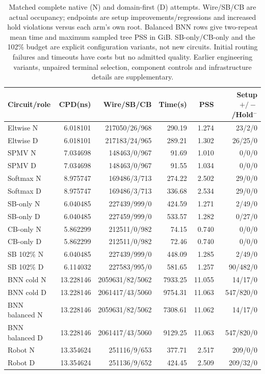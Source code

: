 \documentclass[conference,10pt]{IEEEtran}
\begin{document}
\begin{table}[t]
\centering\footnotesize\setlength{\tabcolsep}{3pt}
\caption{Matched complete native (N) and domain-first (D) attempts. Wire/SB/CB are actual occupancy; endpoints are setup improvements/regressions and increased hold violations versus each arm's own root. Balanced BNN rows give two-repeat mean time and maximum sampled tree PSS in GiB. SB-only/CB-only and the 102\% budget are explicit configuration variants, not new circuits. Initial routing failures and timeouts have costs but no admitted quality. Earlier engineering variants, unpaired terminal selection, component controls and infrastructure details are supplementary.}
\label{tab:completecost}
\begin{tabular}{lrrrrr}\hline
Circuit/role & CPD(ns) & Wire/SB/CB & Time(s) & PSS & Setup $+/-$/Hold$^-$\\\hline
Eltwise N&6.018101&217050/26/968&290.19&1.274&23/2/0\\
Eltwise D&6.018101&217183/24/965&289.21&1.302&26/25/0\\
SPMV N&7.034698&148463/0/967&91.69&1.010&0/0/0\\
SPMV D&7.034698&148463/0/967&91.55&1.034&0/0/0\\
Softmax N&8.975747&169486/3/713&274.22&2.502&29/0/0\\
Softmax D&8.975747&169486/3/713&336.68&2.534&29/0/0\\
SB-only N&6.040485&227439/999/0&424.59&1.271&2/49/0\\
SB-only D&6.040485&227459/999/0&533.57&1.282&0/27/0\\
CB-only N&5.862299&212511/0/982&74.15&0.740&0/0/0\\
CB-only D&5.862299&212511/0/982&72.46&0.740&0/0/0\\
SB 102\% N&6.040485&227439/999/0&448.09&1.285&2/49/0\\
SB 102\% D&6.114032&227583/995/0&581.65&1.257&90/482/0\\
BNN cold N&13.228146&2059631/82/5062&7933.25&11.055&14/17/0\\
BNN cold D&13.228146&2061417/43/5060&9754.31&11.063&547/820/0\\
BNN balanced N&13.228146&2059631/82/5062&7308.61&11.062&14/17/0\\
BNN balanced D&13.228146&2061417/43/5060&9129.25&11.063&547/820/0\\
Robot N&13.354624&251116/9/653&377.71&2.517&209/0/0\\
Robot D&13.354624&251136/9/652&424.45&2.509&209/32/0\\

\end{tabular}
\end{table}
\end{document}
